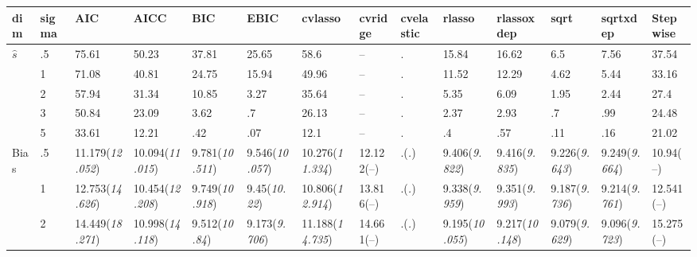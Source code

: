 \documentclass{article}
\begin{document}
\begin{table}[tbp] \centering
{}

{\tiny
\begin{tabularx}{\textwidth}{lCCCCCCCCCCCCC}

\toprule
{dim}&{sigma}&{AIC}&{AICC}&{BIC}&{EBIC}&{cvlasso}&{cvridge}&{cvelastic}&{rlasso}&{rlassoxdep}&{sqrt}&{sqrtxdep}&{Stepwise} \tabularnewline
\midrule\addlinespace[1.5ex]
$\hat{s}$&.5&75.61&50.23&37.81&25.65&58.6&--&.&15.84&16.62&6.5&7.56&37.54 \tabularnewline
&1&71.08&40.81&24.75&15.94&49.96&--&.&11.52&12.29&4.62&5.44&33.16 \tabularnewline
&2&57.94&31.34&10.85&3.27&35.64&--&.&5.35&6.09&1.95&2.44&27.4 \tabularnewline
&3&50.84&23.09&3.62&.7&26.13&--&.&2.37&2.93&.7&.99&24.48 \tabularnewline
&5&33.61&12.21&.42&.07&12.1&--&.&.4&.57&.11&.16&21.02 \tabularnewline
\midrule Bias&.5&11.179\newline (\emph{12.052})&10.094\newline (\emph{11.015})&9.781\newline (\emph{10.511})&9.546\newline (\emph{10.057})&10.276\newline (\emph{11.334})&12.122\newline (--)&.\newline (\emph{.})&9.406\newline (\emph{9.822})&9.416\newline (\emph{9.835})&9.226\newline (\emph{9.643})&9.249\newline (\emph{9.664})&10.94\newline (--) \tabularnewline
&1&12.753\newline (\emph{14.626})&10.454\newline (\emph{12.208})&9.749\newline (\emph{10.918})&9.45\newline (\emph{10.22})&10.806\newline (\emph{12.914})&13.816\newline (--)&.\newline (\emph{.})&9.338\newline (\emph{9.959})&9.351\newline (\emph{9.993})&9.187\newline (\emph{9.736})&9.214\newline (\emph{9.761})&12.541\newline (--) \tabularnewline
&2&14.449\newline (\emph{18.271})&10.998\newline (\emph{14.118})&9.512\newline (\emph{10.84})&9.173\newline (\emph{9.706})&11.188\newline (\emph{14.735})&14.661\newline (--)&.\newline (\emph{.})&9.195\newline (\emph{10.055})&9.217\newline (\emph{10.148})&9.079\newline (\emph{9.629})&9.096\newline (\emph{9.723})&15.275\newline (--) \tabularnewline

\end{tabularx}}
\end{table}
\end{document}
